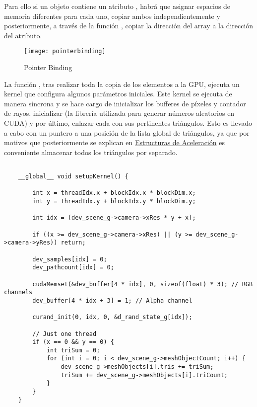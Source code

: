Para ello si un objeto  contiene un atributo , habrá que asignar espacios de memoria diferentes para cada uno, copiar ambos independientemente y posteriormente, a través de la función , copiar la dirección del array a la dirección del atributo.


\begin{figure}[H]
    \centering
	\texttt{[image: pointerbinding]}
	\caption{Pointer Binding}
	\label{fig:pointerbinding}
\end{figure}


La función , tras realizar toda la copia de los elementos a la GPU, ejecuta un kernel que configura algunos parámetros iniciales. Este kernel  se ejecuta de manera síncrona y se hace cargo de inicializar los bufferes de píxeles y contador de rayos, inicializar  (la librería utilizada para generar números aleatorios en CUDA) y por último, enlazar cada  con sus pertinentes triángulos. Esto es llevado a cabo con un puntero a una posición de la lista global de triángulos, ya que por motivos que posteriormente se explican en \hyperref[BVH]{Estructuras de Aceleración} es conveniente almacenar todos los triángulos por separado. 



\begin{lstlisting}
	
	__global__ void setupKernel() {

		int x = threadIdx.x + blockIdx.x * blockDim.x;
		int y = threadIdx.y + blockIdx.y * blockDim.y;

		int idx = (dev_scene_g->camera->xRes * y + x);

		if ((x >= dev_scene_g->camera->xRes) || (y >= dev_scene_g->camera->yRes)) return;

		dev_samples[idx] = 0;
		dev_pathcount[idx] = 0;

		cudaMemset(&dev_buffer[4 * idx], 0, sizeof(float) * 3); // RGB channels
		dev_buffer[4 * idx + 3] = 1; // Alpha channel

		curand_init(0, idx, 0, &d_rand_state_g[idx]);

		// Just one thread
		if (x == 0 && y == 0) {
			int triSum = 0;
			for (int i = 0; i < dev_scene_g->meshObjectCount; i++) {
				dev_scene_g->meshObjects[i].tris += triSum;
				triSum += dev_scene_g->meshObjects[i].triCount;
			}
		}
	}
\end{lstlisting}
	
